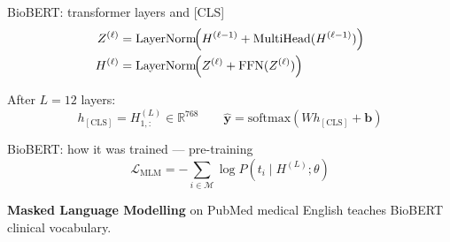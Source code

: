 \begin{frame}{BioBERT: transformer layers and [CLS]}
  \begin{align*}
    Z^{(\ell)} &= \mathrm{LayerNorm}\!\Bigl(H^{(\ell-1)} + \mathrm{MultiHead}(H^{(\ell-1)})\Bigr) \\
    H^{(\ell)} &= \mathrm{LayerNorm}\!\Bigl(Z^{(\ell)} + \mathrm{FFN}(Z^{(\ell)})\Bigr)
  \end{align*}

  \vspace{0.3em}
  After $L=12$ layers:
  \begin{equation*}
    h_{\mathrm{[CLS]}} = H^{(L)}_{1,:} \in \mathbb{R}^{768}
    \qquad
    \hat{\mathbf{y}} = \mathrm{softmax}(W h_{\mathrm{[CLS]}} + \mathbf{b})
  \end{equation*}

\end{frame}

\begin{frame}{BioBERT: how it was trained --- pre-training}
  \begin{equation*}
    \mathcal{L}_{\mathrm{MLM}} = -\sum_{i \in \mathcal{M}} \log P(t_i \mid H^{(L)}; \theta)
  \end{equation*}

  \textbf{Masked Language Modelling} on PubMed medical English teaches BioBERT clinical vocabulary.

\end{frame}

